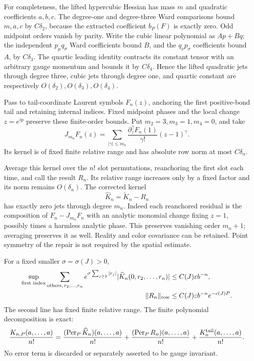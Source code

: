 \documentclass[11pt]{article}
\theoremstyle{remark}
\begin{document}
For completeness, the lifted hypercubic Hessian has
mass \(m\) and quadratic coefficients \(a,b,c\).
The degree-one and degree-three Ward comparisons bound
\(m,a,c\) by \(C\delta_2\), because the extracted
coefficient \(b_P(F)\) is exactly zero. Odd midpoint
orders vanish by parity. Write the cubic linear polynomial
as \(A p+B q\); the independent \(p_\mu q_\sigma\) Ward
coefficients bound \(B\), and the \(q_\nu p_\sigma\)
coefficients bound \(A\), by \(C\delta_3\). The quartic
leading identity contracts its constant tensor with an
arbitrary gauge momentum and bounds it by
\(C\delta_4\). Hence the lifted quadratic jets through
degree three, cubic jets through degree one, and quartic
constant are respectively \(O(\delta_2),O(\delta_3),
O(\delta_4)\).

Pass to tail-coordinate Laurent symbols \(F_n(z)\),
anchoring the first positive-bond tail and retaining
internal indices. Fixed midpoint phases and the local
change \(z=e^{ip}\) preserve these finite-order bounds.
Put \(m_2=3,m_3=1,m_4=0\), and take
\begin{equation}
 J_{m_n}F_n(z)=
    \sum_{|\gamma|\le m_n}
       \frac{\partial_z^\gamma F_n(1)}{\gamma!}
                         (z-1)^\gamma.
 \label{fcc-laurent-jet}
\end{equation}
Its kernel is of fixed finite relative range and has
absolute row norm at most \(C\delta_n\).

Average this kernel over the \(n!\) slot permutations,
reanchoring the first slot each time, and call the result
\(R_n\). Its relative range increases only by a fixed
factor and its norm remains \(O(\delta_n)\).
The corrected kernel
\begin{equation}
 \widehat K_n=\widetilde K_n-R_n
 \label{fcc-repaired-kernel}
\end{equation}
has exactly zero jets through degree \(m_n\). Indeed
each reanchored residual is the composition of
\(F_n-J_{m_n}F_n\) with an analytic monomial change
fixing \(z=1\), possibly times a harmless analytic
phase. This preserves vanishing order \(m_n+1\);
averaging preserves it as well. Reality and color
covariance can be retained. Point symmetry of the
repair is not required by the spatial estimate.

For a fixed smaller \(\sigma=\sigma(J)>0\),
\begin{align}
 \sup_{\text{first index}}\sum_{\text{others},\,r_2,\ldots,r_n}
 e^{\sigma\sum_{j\ge2}|r_j|}
      |\widehat K_n(0,r_2,\ldots,r_n)|
       &\le C(J)\varepsilon b^{-n},\notag\\
 \|R_n\|_{\rm row}
       &\le C(J)\varepsilon b^{-n}e^{-c(J)P}.
 \label{fcc-repaired-bounds}
\end{align}
The second line has fixed finite relative range.
The finite polynomial decomposition is exact:
\begin{equation}
 \frac{K_{n,P}(a,\ldots,a)}{n!}
  =\frac{(\operatorname{Per}_P\widehat K_n)(a,\ldots,a)}{n!}
   +\frac{(\operatorname{Per}_P R_n)(a,\ldots,a)}{n!}
   +\frac{K_n^{\rm tail}(a,\ldots,a)}{n!}.
 \label{fcc-polynomial-decomposition}
\end{equation}
No error term is discarded or separately asserted to
be gauge invariant.
\end{document}
